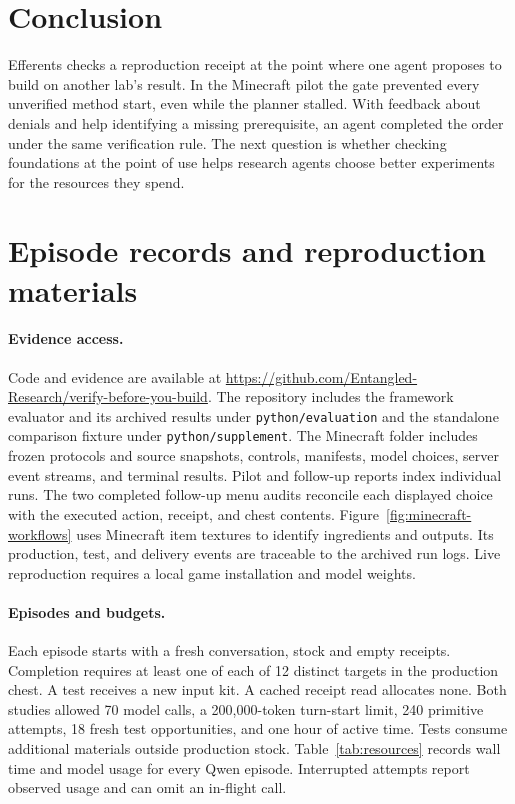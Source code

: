 \documentclass{article}
\begin{document}
\section{Conclusion}

Efferents checks a reproduction receipt at the point where one agent proposes to build on another lab's result. In the Minecraft pilot the gate prevented every unverified method start, even while the planner stalled. With feedback about denials and help identifying a missing prerequisite, an agent completed the order under the same verification rule. The next question is whether checking foundations at the point of use helps research agents choose better experiments for the resources they spend.

\clearpage



\clearpage
\appendix
\section{Episode records and reproduction materials}\label{app:evidence}

\paragraph{Evidence access.}
Code and evidence are available at \url{https://github.com/Entangled-Research/verify-before-you-build}. The repository includes the framework evaluator and its archived results under \texttt{python/evaluation} and the standalone comparison fixture under \texttt{python/supplement}. The Minecraft folder includes frozen protocols and source snapshots, controls, manifests, model choices, server event streams, and terminal results. Pilot and follow-up reports index individual runs. The two completed follow-up menu audits reconcile each displayed choice with the executed action, receipt, and chest contents. Figure~\ref{fig:minecraft-workflows} uses Minecraft item textures to identify ingredients and outputs. Its production, test, and delivery events are traceable to the archived run logs. Live reproduction requires a local game installation and model weights.

\paragraph{Episodes and budgets.}
Each episode starts with a fresh conversation, stock and empty receipts. Completion requires at least one of each of 12 distinct targets in the production chest. A test receives a new input kit. A cached receipt read allocates none. Both studies allowed 70 model calls, a 200,000-token turn-start limit, 240 primitive attempts, 18 fresh test opportunities, and one hour of active time. Tests consume additional materials outside production stock. Table~\ref{tab:resources} records wall time and model usage for every Qwen episode. Interrupted attempts report observed usage and can omit an in-flight call.
\end{document}
